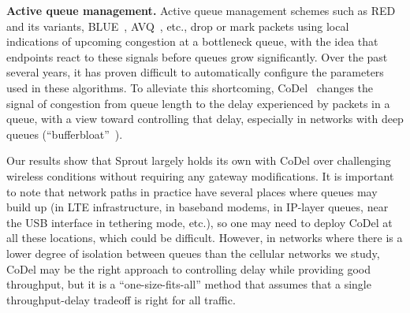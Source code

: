 \vspace{\baselineskip}
\noindent \textbf{Active queue management.} Active queue management schemes such as RED~\cite{Floyd93} and its
variants, BLUE~\cite{BLUE}, AVQ~\cite{AVQ}, etc., drop or mark packets
using local indications of upcoming congestion at a bottleneck queue,
with the idea that endpoints react to these signals before queues
grow significantly. Over the past several years, it has proven
difficult to automatically configure the parameters used in these
algorithms. To alleviate this shortcoming, CoDel~\cite{CoDel} changes
the signal of congestion from queue length to the delay experienced by
packets in a queue, with a view toward controlling that delay,
especially in networks with deep queues
(``bufferbloat''~\cite{bufferbloat}).

Our results show that Sprout largely holds its own with CoDel over
challenging wireless conditions without requiring any gateway
modifications. It is important to note that network paths in practice
have several places where queues may build up (in LTE infrastructure, in baseband modems, in IP-layer
queues, near the USB interface in tethering mode, etc.), so one may
need to deploy CoDel at all these locations, which could be
difficult. However, in networks where there is a lower degree of
isolation between queues than the cellular networks we study, CoDel
may be the right approach to controlling delay while providing good
throughput, but it is a ``one-size-fits-all'' method that assumes
that a single throughput-delay tradeoff is right for all traffic. 
%

